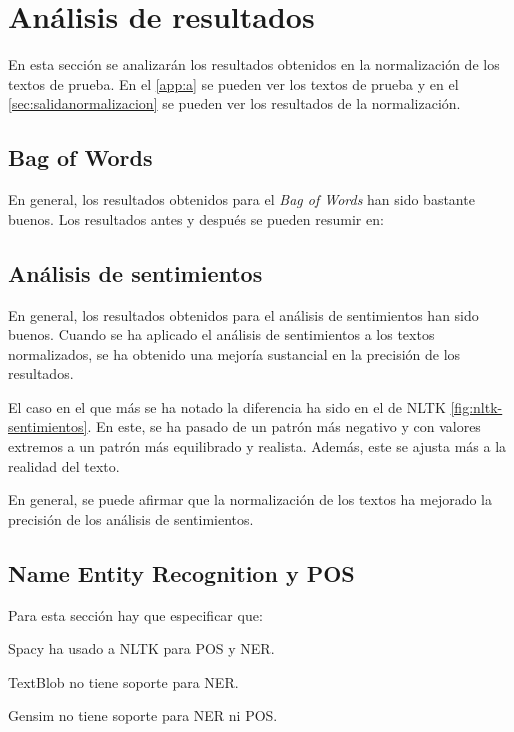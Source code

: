 \documentclass[a4paper,twocolumn]{article}
\begin{document}
    \section{Análisis de resultados}\label{sec:analisis-de-resultados}
    En esta sección se analizarán los resultados obtenidos en la normalización de los textos de prueba.
    En el \autoref{app:a} se pueden ver los textos de prueba y en el \autoref{sec:salidanormalizacion} se pueden ver los resultados de la normalización.

    \subsection{Bag of Words}\label{subsec:bow}
    En general, los resultados obtenidos para el \textit{Bag of Words} han sido bastante buenos.
    Los resultados antes y después se pueden resumir en:

    \subsection{Análisis de sentimientos}\label{subsec:sentimientos}
    En general, los resultados obtenidos para el análisis de sentimientos han sido buenos.
    Cuando se ha aplicado el análisis de sentimientos a los textos normalizados, se ha obtenido una mejoría sustancial en la precisión de los resultados.

    El caso en el que más se ha notado la diferencia ha sido en el de NLTK \autoref{fig:nltk-sentimientos}.
    En este, se ha pasado de un patrón más negativo y con valores extremos a un patrón más equilibrado y realista.
    Además, este se ajusta más a la realidad del texto.

    En general, se puede afirmar que la normalización de los textos ha mejorado la precisión de los análisis de sentimientos.


    \subsection{Name Entity Recognition y POS}\label{subsec:ner-pos}
    Para esta sección hay que especificar que:
    \itemize
    {
    \item Spacy ha usado a NLTK para POS y NER.
    \item TextBlob no tiene soporte para NER.
    \item Gensim no tiene soporte para NER ni POS.
    }
\end{document}
